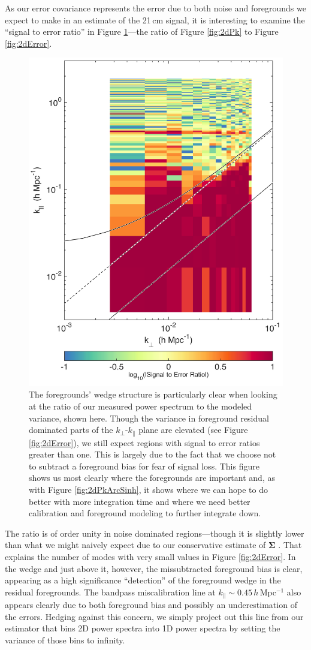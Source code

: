 As our error covariance represents the error due to both noise and foregrounds we expect to make in an estimate of the 21\,cm signal, it is interesting to examine the ``signal to error ratio'' in Figure \ref{fig:2dSNR}---the ratio of Figure \ref{fig:2dPk} to Figure \ref{fig:2dError}.
\begin{figure}[] 
	\centering 
	\includegraphics[width=.48\textwidth]{chap4_empirical_covariance/2dSNR.png}
	\caption[The foreground wedge is clear in the ratio of our measured power spectrum to the modeled variance]{The foregrounds' wedge structure is particularly clear when looking at the ratio of our measured power spectrum to the modeled variance, shown here. Though the variance in foreground residual dominated parts of the $k_\perp$-$k_\|$ plane are elevated (see Figure \ref{fig:2dError}), we still expect regions with signal to error ratios greater than one. This is largely due to the fact that we choose not to subtract a foreground bias for fear of signal loss. This figure shows us most clearly where the foregrounds are important and, as with Figure \ref{fig:2dPkArcSinh}, it shows where we can hope to do better with more integration time and where we need better calibration and foreground modeling to further integrate down.}
	\label{fig:2dSNR}
\end{figure}
The ratio is of order unity in noise dominated regions---though it is slightly lower than what we might naively expect due to our conservative estimate of $\boldsymbol\Sigma$ \citep{X13}. That explains the number of modes with very small values in Figure \ref{fig:2dError}. In the wedge and just above it, however, the missubtracted foreground bias is clear, appearing as a high significance ``detection'' of the foreground wedge in the residual foregrounds. The bandpass miscalibration line at $k_\| \sim 0.45$\,$h$\,Mpc$^{-1}$ also appears clearly due to both foreground bias and possibly an underestimation of the errors. Hedging against this concern, we simply project out this line from our estimator that bins 2D power spectra into 1D power spectra by setting the variance of those bins to infinity.

